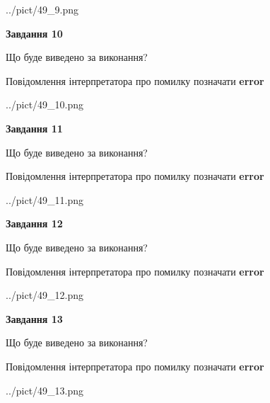 \documentclass[11pt, ukrainian]{article}
\begin{document}
{\begin {large}
\begin{center}
	{../pict/49_9.png}
\end{center}
\newpage

{\begin {center}\textbf{Завдання 10}\end {center}}\par
Що буде виведено за виконання? \par
Повідомлення інтерпретатора про помилку позначати \textbf{error}

\begin{center}
	{../pict/49_10.png}
\end{center}
\newpage

{\begin {center}\textbf{Завдання 11}\end {center}}\par
Що буде виведено за виконання? \par
Повідомлення інтерпретатора про помилку позначати \textbf{error}

\begin{center}
	{../pict/49_11.png}
\end{center}
\newpage

{\begin {center}\textbf{Завдання 12}\end {center}}\par
Що буде виведено за виконання? \par
Повідомлення інтерпретатора про помилку позначати \textbf{error}

\begin{center}
	{../pict/49_12.png}
\end{center}
\newpage

{\begin {center}\textbf{Завдання 13}\end {center}}\par
Що буде виведено за виконання? \par
Повідомлення інтерпретатора про помилку позначати \textbf{error}

\begin{center}
	{../pict/49_13.png}
\end{center}
\newpage


\end{large}}
\end{document}
